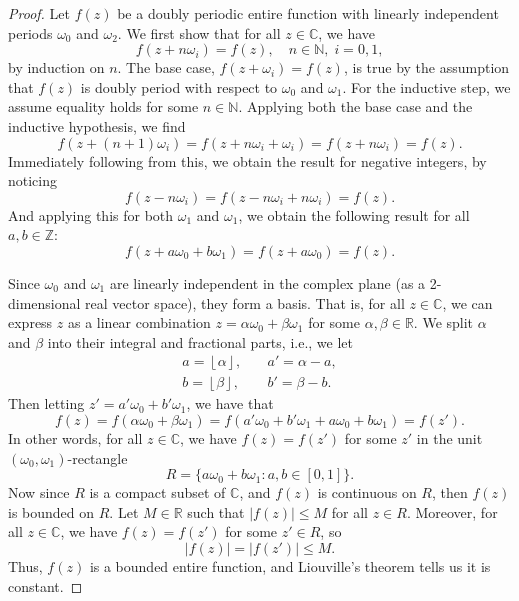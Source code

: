\documentclass[12pt]{article}
\newcommand{\N}{\mathbb{N}} %
\newcommand{\Z}{\mathbb{Z}} %
\newcommand{\R}{\mathbb{R}} %
\newcommand{\C}{\mathbb{C}} %
\newcommand{\floor}[1]{\left\lfloor #1 \right\rfloor} %
\newcommand{\<}{\left\langle} %
\renewcommand{\>}{\right\rangle} %
\begin{document}
\begin{proof}
    Let $f(z)$ be a doubly periodic entire function with linearly independent periods $\omega_0$ and $\omega_2$. We first show that for all $z \in \C$, we have
    \[
        f(z + n\omega_i) = f(z), \quad n \in \N,\; i = 0, 1,
    \]
    by induction on $n$. The base case, $f(z + \omega_i) = f(z)$, is true by the assumption that $f(z)$ is doubly period with respect to $\omega_0$ and $\omega_1$. For the inductive step, we assume equality holds for some $n \in \N$. Applying both the base case and the inductive hypothesis, we find
    \[
        f(z + (n+1)\omega_i) = f(z + n\omega_i + \omega_i) = f(z + n\omega_i)  = f(z).
    \]
    Immediately following from this, we obtain the result for negative integers, by noticing
    \[
        f(z - n\omega_i) = f(z - n\omega_i + n\omega_i) = f(z).
    \]
    And applying this for both $\omega_1$ and $\omega_1$, we obtain the following result for all $a, b \in \Z$:
    \[
        f(z + a\omega_0 + b\omega_1) = f(z + a\omega_0) = f(z).
    \]
    
    Since $\omega_0$ and $\omega_1$ are linearly independent in the complex plane (as a 2-dimensional real vector space), they form a basis. That is, for all $z \in \C$, we can express $z$ as a linear combination $z = \alpha\omega_0 + \beta\omega_1$ for some $\alpha, \beta \in \R$. We split $\alpha$ and $\beta$ into their integral and fractional parts, i.e., we let
    \begin{align*}
        a = \floor{\alpha}, &\quad a' = \alpha - a, \\
        b = \floor{\beta}, &\quad b' = \beta - b.
    \end{align*}
    Then letting $z' = a'\omega_0 + b'\omega_1$, we have that
    \[
        f(z) = f(\alpha\omega_0 + \beta\omega_1) = f(a'\omega_0 + b'\omega_1 + a\omega_0 + b\omega_1) = f(z').
    \]
    In other words, for all $z \in \C$, we have $f(z) = f(z')$ for some $z'$ in the unit $(\omega_0, \omega_1)$-rectangle
    \[
        R = \{a\omega_0 + b\omega_1 : a, b \in [0, 1]\}.
    \]
    Now since $R$ is a compact subset of $\C$, and $f(z)$ is continuous on $R$, then $f(z)$ is bounded on $R$. Let $M \in \R$ such that $|f(z)| \leq M$ for all $z \in R$. Moreover, for all $z \in \C$, we have $f(z) = f(z')$ for some $z' \in R$, so
    \[
        |f(z)| = |f(z')| \leq M.
    \]
    Thus, $f(z)$ is a bounded entire function, and Liouville's theorem tells us it is constant.
    
\end{proof}
\end{document}

